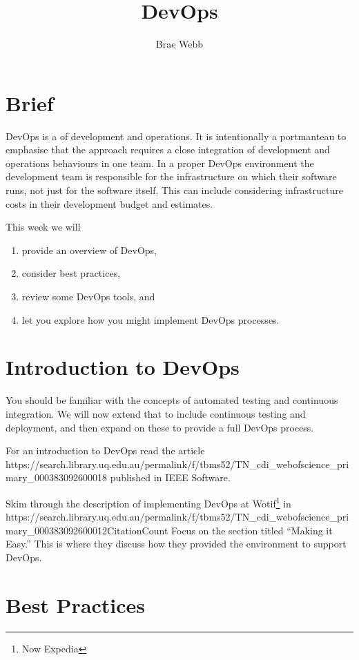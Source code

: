 \documentclass{csse4400}
\title{DevOps}
\author{Brae Webb}
\date{\week{4}}
\begin{document}
\maketitle

\section{Brief}
DevOps is a  of development and operations.
It is intentionally a portmanteau to emphasise that the approach requires a close integration
of development and operations behaviours in one team.
In a proper DevOps environment the development team is responsible for the infrastructure on which their software runs,
not just for the software itself.
This can include considering infrastructure costs in their development budget and estimates.

This week we will
\begin{enumerate}
    \item provide an overview of DevOps,
    \item consider best practices,
    \item review some DevOps tools, and
    \item let you explore how you might implement DevOps processes.
\end{enumerate}


\section{Introduction to DevOps}
You should be familiar with the concepts of automated testing and continuous integration.
We will now extend that to include continuous testing and deployment,
and then expand on these to provide a full DevOps process.

For an introduction to DevOps read the article 
{https://search.library.uq.edu.au/permalink/f/tbms52/TN_cdi_webofscience_primary_000383092600018}
published in IEEE Software.

Skim through the description of implementing DevOps at Wotif\footnote{Now Expedia} in
{https://search.library.uq.edu.au/permalink/f/tbms52/TN_cdi_webofscience_primary_000383092600012CitationCount}
Focus on the section titled ``Making it Easy.''
This is where they discuss how they provided the environment to support DevOps.


\section{Best Practices}
\end{document}
